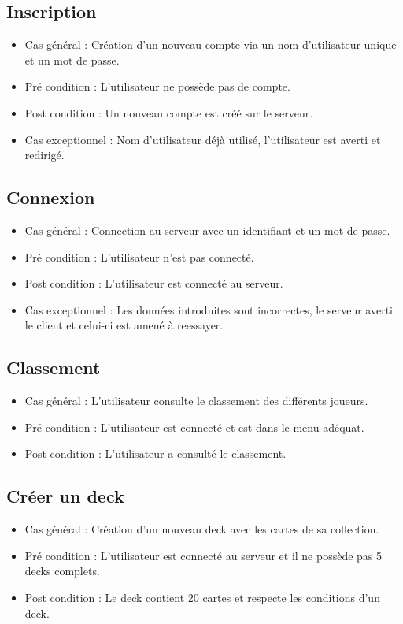 \subsection{Inscription}\label{insc}
\begin{itemize}
    \item Cas général  : Création d'un nouveau compte via un nom d'utilisateur unique et un mot de passe.
    \item Pré condition  : L'utilisateur ne possède pas de compte.
    \item Post condition : Un nouveau compte est créé sur le serveur.
    \item Cas exceptionnel : Nom d'utilisateur déjà utilisé, l'utilisateur est averti et redirigé.
\end{itemize}
\subsection{Connexion}\label{connec}
\begin{itemize}
    \item Cas général : Connection au serveur avec un identifiant et un mot de passe.
    \item Pré condition  : L'utilisateur n'est pas connecté.
    \item Post condition : L'utilisateur est connecté au serveur.
    \item Cas exceptionnel : Les données introduites sont incorrectes, le serveur averti le client et celui-ci est amené à reessayer.
\end{itemize}
\subsection{Classement}
\begin{itemize}
    \item Cas général : L'utilisateur consulte le classement des différents joueurs.
    \item Pré condition : L'utilisateur est connecté et est dans le menu adéquat.
    \item Post condition : L'utilisateur a consulté le classement.
\end{itemize}
\subsection{Créer un deck}
\begin{itemize}
    \item Cas général : Création d'un nouveau deck avec les cartes de sa collection.
    \item Pré condition  : L'utilisateur est connecté au serveur et il ne possède pas 5 decks complets.
    \item Post condition : Le deck contient 20 cartes et respecte les conditions d'un deck.
\end{itemize}
